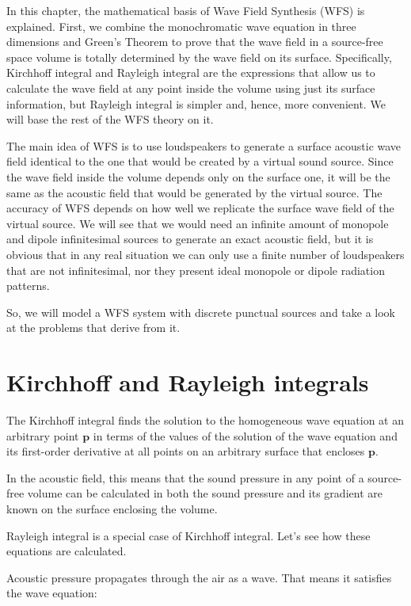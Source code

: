 In this chapter, the mathematical basis of Wave Field Synthesis (WFS) is explained. First, we combine the monochromatic wave equation in three dimensions and Green's Theorem to prove that the wave field in a source-free space volume is totally determined by the wave field on its surface. Specifically, Kirchhoff integral and Rayleigh integral are the expressions that allow us to calculate the wave field at any point inside the volume using just its surface information, but Rayleigh integral is simpler and, hence, more convenient. We will base the rest of the WFS theory on it.

The main idea of WFS is to use loudspeakers to generate a surface acoustic wave field identical to the one that would be created by a virtual sound source. Since the wave field inside the volume depends only on the surface one, it will be the same as the acoustic field that would be generated by the virtual source. The accuracy of WFS depends on how well we replicate the surface wave field of the virtual source. We will see that we would need an infinite amount of monopole and dipole infinitesimal sources to generate an exact acoustic field, but it is obvious that in any real situation we can only use a finite number of loudspeakers that are not infinitesimal, nor they present ideal monopole or dipole radiation patterns. 

So, we will model a WFS system with discrete punctual sources and take a look at the problems that derive from it.

\section{Kirchhoff and Rayleigh integrals}

The Kirchhoff integral finds the solution to the homogeneous wave equation at an arbitrary point $\mathbf{p}$ in terms of the values of the solution of the wave equation and its first-order derivative at all points on an arbitrary surface that encloses $\mathbf{p}$.

In the acoustic field, this means that the sound pressure in any point of a source-free volume can be calculated in both the sound pressure and its gradient are known on the surface enclosing the volume. 

Rayleigh integral is a special case of Kirchhoff integral. Let's see how these equations are calculated.

Acoustic pressure propagates through the air as a wave. That means it satisfies the wave equation:

